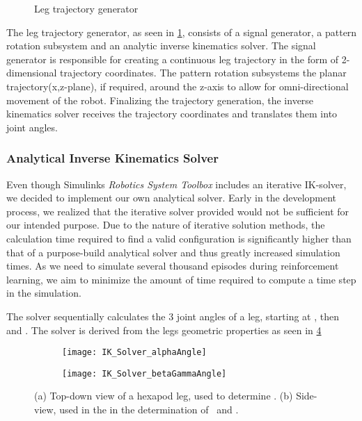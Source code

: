 \begin{figure}
	\centerline{}
	\caption{Leg trajectory generator}
	\label{figure: Leg trajectory generator}
\end{figure}

The leg trajectory generator, as seen in \ref{figure: Leg trajectory generator}, consists of a signal generator, a pattern rotation subsystem and an analytic inverse kinematics solver.
The signal generator is responsible for creating a continuous leg trajectory in the form of 2-dimensional trajectory coordinates.
The pattern rotation subsystems the planar trajectory(x,z-plane), if required, around the z-axis to allow for omni-directional movement of the robot.
Finalizing the trajectory generation, the inverse kinematics solver receives the trajectory coordinates and translates them into joint angles.


\subsubsection{Analytical Inverse Kinematics Solver}
Even though Simulinks \textit{Robotics System Toolbox} includes an iterative IK-solver, we decided to implement our own analytical solver.
Early in the development process, we realized that the iterative solver provided would not be sufficient for our intended purpose.
Due to the nature of iterative solution methods, the calculation time required to find a valid configuration is significantly higher than that of a purpose-build analytical solver and thus greatly increased simulation times.
As we need to simulate several thousand episodes during reinforcement learning, we aim to minimize the 
amount of time required to compute a time step in the simulation.

The solver sequentially calculates the 3 joint angles of a leg, starting at \textalpha, then \textbeta and \textgamma.
The solver is derived from the legs geometric properties as seen in \ref{figure: IK angle derivations}

\begin{figure}[h]
	\begin{subfigure}{.5\textwidth} %
		\centering
		\texttt{[image: IK\_Solver\_alphaAngle]}  %
		\caption{}
		\label{figure: IK Solver Alpha Angle}
	\end{subfigure}
	\begin{subfigure}{.5\textwidth}
		\centering
		\texttt{[image: IK\_Solver\_betaGammaAngle]}  
		\caption{}
		\label{figure: IK Solver Beta/Gamma Angle}
	\end{subfigure}
	\caption[Angle derivation drawings]{(a) Top-down view of a hexapod leg, used to determine \textalpha. (b) Side-view, used in the in the determination of \textbeta \ and \textgamma.}
	\label{figure: IK angle derivations}
\end{figure}



